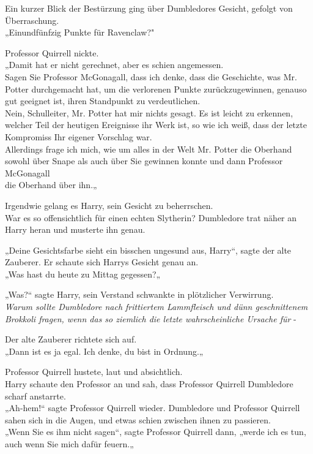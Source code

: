 {Ein kurzer Blick der Bestürzung ging über Dumbledores Gesicht, gefolgt von Überraschung.\\ „Einundfünfzig Punkte für Ravenclaw?"

Professor Quirrell nickte.\\ „Damit hat er nicht gerechnet, aber es schien angemessen.\\ Sagen Sie Professor McGonagall, dass ich denke, dass die Geschichte, was Mr. Potter durchgemacht hat, um die verlorenen Punkte zurückzugewinnen, genauso gut geeignet ist, ihren Standpunkt zu verdeutlichen.\\ Nein, Schulleiter, Mr. Potter hat mir nichts gesagt. Es ist leicht zu erkennen, welcher Teil der heutigen Ereignisse ihr Werk ist, so wie ich weiß, dass der letzte Kompromiss Ihr eigener Vorschlag war.\\ Allerdings frage ich mich, wie um alles in der Welt Mr. Potter die Oberhand sowohl über Snape als auch über Sie gewinnen konnte und dann Professor McGonagall\\ die Oberhand über ihn.„

Irgendwie gelang es Harry, sein Gesicht zu beherrschen.\\ War es so offensichtlich für einen echten Slytherin? Dumbledore trat näher an Harry heran und musterte ihn genau.

„Deine Gesichtsfarbe sieht ein bisschen ungesund aus, Harry“, sagte der alte Zauberer. Er schaute sich Harrys Gesicht genau an.\\ „Was hast du heute zu Mittag gegessen?„

„Was?“ sagte Harry, sein Verstand schwankte in plötzlicher Verwirrung.\\ \emph{Warum sollte Dumbledore nach frittiertem Lammfleisch und dünn geschnittenem Brokkoli fragen, wenn das so ziemlich die letzte wahrscheinliche Ursache für} -

Der alte Zauberer richtete sich auf.\\ „Dann ist es ja egal. Ich denke, du bist in Ordnung.„

Professor Quirrell hustete, laut und absichtlich.\\ Harry schaute den Professor an und sah, dass Professor Quirrell Dumbledore scharf anstarrte.\\ „Ah-hem!“ sagte Professor Quirrell wieder. Dumbledore und Professor Quirrell sahen sich in die Augen, und etwas schien zwischen ihnen zu passieren.\\ „Wenn Sie es ihm nicht sagen“, sagte Professor Quirrell dann, „werde ich es tun, auch wenn Sie mich dafür feuern.„

}
